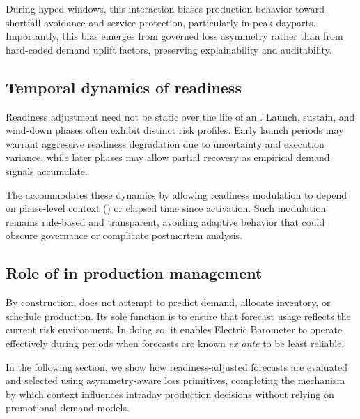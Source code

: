 During hyped \LTO{} windows, this interaction biases production behavior toward shortfall
avoidance and service protection, particularly in peak dayparts. Importantly, this bias emerges from
governed loss asymmetry rather than from hard-coded demand uplift factors, preserving
explainability and auditability.

\subsection{Temporal dynamics of readiness}
\label{subsec:ral-temporal}

Readiness adjustment need not be static over the life of an \LTO{}. Launch, sustain, and wind-down
phases often exhibit distinct risk profiles. Early launch periods may warrant aggressive readiness
degradation due to uncertainty and execution variance, while later phases may allow partial
recovery as empirical demand signals accumulate.

The \RAL{} accommodates these dynamics by allowing readiness modulation to depend on phase-level
context (\ltoPhase{}) or elapsed time since activation. Such modulation remains rule-based and
transparent, avoiding adaptive behavior that could obscure governance or complicate postmortem
analysis.

\subsection{Role of \RAL{} in production management}
\label{subsec:ral-role}

By construction, \RAL{} does not attempt to predict demand, allocate inventory, or schedule
production. Its sole function is to ensure that forecast usage reflects the current risk environment.
In doing so, it enables Electric Barometer to operate effectively during periods when forecasts are
known \emph{ex ante} to be least reliable.

In the following section, we show how readiness-adjusted forecasts are evaluated and selected using
asymmetry-aware loss primitives, completing the mechanism by which \LTO{} context influences
intraday production decisions without relying on promotional demand models.
